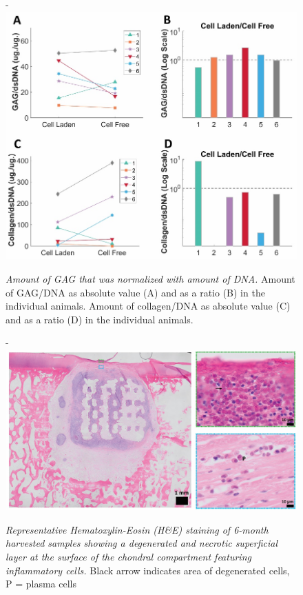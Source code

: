 \documentclass[twocolumn, empirical, authordate, issue]{jote-new-article}
\begin{document}
\begin{figure}
\begin{adjustwidth}{-\fullwidthlen}{}
\includegraphics[width=\columnwidth]{media/image14.jpg}
\caption{\emph{Amount of GAG that was normalized with amount of DNA.}  Amount of GAG/DNA as absolute value (A) and as a ratio (B) in the individual animals. Amount of collagen/DNA as absolute value (C) and as a ratio (D) in the individual animals.}
\label{fig:sup3}
\end{adjustwidth}
\end{figure}


\begin{figure}
\begin{adjustwidth}{-\fullwidthlen}{}
 \includegraphics[width=.6\columnwidth]{media/image15.jpg}
\caption{\emph{Representative Hematoxylin-Eosin (H\&E) staining of 6-month harvested samples showing a degenerated and necrotic superficial layer at the surface of the chondral compartment featuring inflammatory cells.}  Black arrow indicates area of degenerated cells, P = plasma cells}
\end{adjustwidth}
\label{fig:sup4}
\end{figure}
\newpage
\twocolumn
\end{document}
